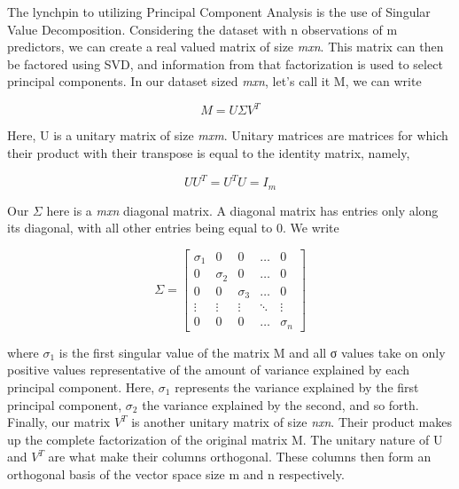 The lynchpin to utilizing Principal Component Analysis is the use of Singular Value Decomposition. Considering the dataset with n observations of m predictors, we can create a real valued matrix of size \textit{mxn}. This matrix can then be factored using SVD, and information from that factorization is used to select principal components. In our dataset sized \textit{mxn}, let’s call it M, we can write
\newline

\begin{equation}
M=U \Sigma V^{T}
\end{equation}

Here, U is a unitary matrix of size \textit{mxm}. Unitary matrices are matrices for which their product with their transpose is equal to the identity matrix, namely,

\begin{equation}
U U^{T} = U^{T} U = I_{m} 
\end{equation}

Our $\Sigma$  here is a \textit{mxn} diagonal matrix. A diagonal matrix has entries only along its diagonal, with all other entries being equal to 0. We write

\[
\Sigma 
= 
\begin{bmatrix}
    \sigma_{1} & 0 & 0 & \dots & 0 \\
    0 & \sigma_{2} & 0 & \dots & 0 \\
    0 & 0 & \sigma_{3} & \dots & 0 \\
    \vdots & \vdots & \vdots & \ddots & \vdots \\
    0 & 0 & 0 & \dots & \sigma_{n}
\end{bmatrix}

\]

where $\sigma_{1}$ is the first singular value of the matrix M and all σ values take on only positive values representative of the amount of variance explained by each principal component. Here, $\sigma_{1}$ represents the variance explained by the first principal component, $\sigma_{2}$ the variance explained by the second, and so forth. Finally, our matrix $V^{T}$ is another unitary matrix of size \textit{nxn}. Their product makes up the complete factorization of the original matrix M. The unitary nature of U and $V^{T}$ are what make their columns orthogonal. These columns then form an orthogonal basis of the vector space size m and n respectively. 

